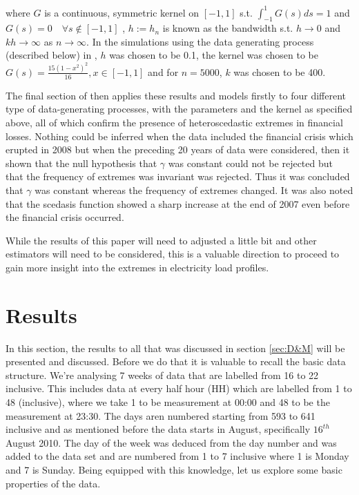 \documentclass[a4paper]{article}
\begin{document}
\noindent where $G$ is a continuous, symmetric kernel on $[-1,1]$ s.t. $\int_{-1}^{1} G(s)ds = 1$ and $G(s) = 0 \quad \forall s \notin [-1,1]$ , $h := h_n$ is known as the bandwidth s.t. $h \rightarrow 0$ and $kh \rightarrow \infty$ as $n \rightarrow \infty$. In the simulations using the data generating process (described below) in \cite{einmahl16}, $h$ was chosen to be 0.1, the kernel was chosen to be $G(s) = \frac{15(1-x^2)^2}{16}, x \in [-1,1]$ and for $n=5000$, $k$ was chosen to be 400.

The final section of \cite{einmahl16} then applies these results and models firstly to four different type of data-generating processes, with the parameters and the kernel as specified above, all of which confirm the presence of heteroscedastic extremes in financial losses. Nothing could be inferred when the data included the financial crisis which erupted in 2008 but when the preceding 20 years of data were considered, then it shown that the null hypothesis that $\gamma$ was constant could not be rejected but that the frequency of extremes was invariant was rejected. Thus it was concluded that $\gamma$ was constant whereas the frequency of extremes changed. It was also noted that the scedasis function showed a sharp increase at the end of 2007 even before the financial crisis occurred.

While the results of this paper will need to adjusted a little bit and other estimators will need to be considered, this is a valuable direction to proceed to gain more insight into the extremes in electricity load profiles.
 
\clearpage


\section{Results}
\label{sec:results}

In this section, the results to all that was discussed in section \ref{sec:D&M} will be presented and discussed.
Before we do that it is valuable to recall the basic data structure. We're analysing 7 weeks of data that are labelled from 16 to 22 inclusive. This includes data at every half hour (HH) which are labelled from 1 to 48 (inclusive), where we take 1 to be measurement at 00:00 and 48 to be the measurement at 23:30. The days aren numbered starting from 593 to 641 inclusive and as mentioned before the data starts in August, specifically $16^{th}$ August 2010. The day of the week was deduced from the day number and was added to the data set and are numbered from 1 to 7 inclusive where 1 is Monday and 7 is Sunday. Being equipped with this knowledge, let us explore some basic properties of the data.
\end{document}
